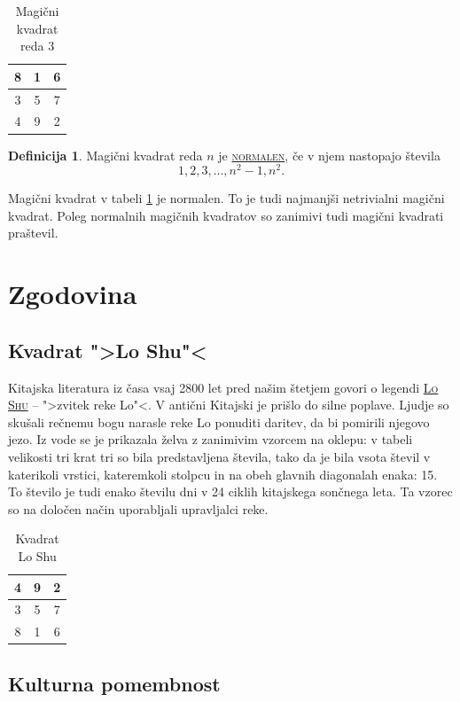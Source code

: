 \documentclass[a4paper,12pt]{article}
\newcommand{\pojem}[1]{\underline{\textsc{#1}}}
\theoremstyle{definition}
\newtheorem{definicija}{Definicija}
\theoremstyle{plain}
\newenvironment{magic}[3]{
   \begin{table}%
   \centering%
   \caption{#2}%
   \label{#3}%
   \large
   \begin{tabular}{|*{#1}{c|}}%
      \hline
}{
   \end{tabular}%
   \end{table}%
}
\begin{document}
\begin{magic}{3}{Magični kvadrat reda 3}{tab:Red3}
   8 & 1 & 6 \\\hline
   3 & 5 & 7 \\\hline
   4 & 9 & 2 \\\hline
\end{magic}
\begin{definicija}
   Magični kvadrat reda $n$ je \pojem{normalen}, če v njem nastopajo števila
   \begin{equation}
      \label{eq:normalen}
      1, 2, 3, \dots, n^2 - 1, n^2.
   \end{equation}
\end{definicija}
Magični kvadrat v tabeli \ref{tab:Red3} je normalen.
To je tudi najmanjši netrivialni magični kvadrat.
Poleg normalnih magičnih kvadratov so zanimivi tudi magični kvadrati praštevil.


\section{Zgodovina}

\subsection{Kvadrat ">Lo Shu"<}

Kitajska literatura iz časa vsaj 2800 let pred našim štetjem govori o legendi
\pojem{Lo Shu} -- ">zvitek reke Lo"<. V antični Kitajski je prišlo do
silne poplave. Ljudje so skušali rečnemu bogu narasle reke Lo ponuditi daritev,
da bi pomirili njegovo jezo. Iz vode se je prikazala želva z zanimivim vzorcem
na oklepu: v tabeli velikosti tri krat tri so bila predstavljena števila, tako
da je bila vsota števil v katerikoli vrstici, kateremkoli stolpcu in na obeh
glavnih diagonalah enaka: 15. To število je tudi enako številu dni v 24 ciklih
kitajskega sončnega leta. Ta vzorec so na določen način uporabljali upravljalci
reke.
\begin{magic}{3}{Kvadrat Lo Shu}{tab:LoShu}
   4 & 9 & 2 \\\hline
   3 & 5 & 7 \\\hline
   8 & 1 & 6 \\\hline
\end{magic}

\subsection{Kulturna pomembnost}
\end{document}
